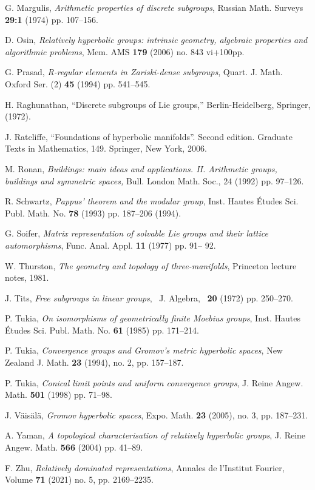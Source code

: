 \documentclass[12pt]{article}
\theoremstyle{boldplain}
\theoremstyle{bolddefinition}
\numberwithin{equation}{section}
\begin{document}
\begin{thebibliography}{BLP05}
G. Margulis, {\em Arithmetic properties of discrete subgroups}, 
Russian Math. Surveys {\bf 29:1} (1974)  pp. 107--156. 	


D. Osin, {\em Relatively hyperbolic groups: intrinsic geometry, algebraic properties and algorithmic problems},
Mem. AMS {\bf 179} (2006) no. 843 vi+100pp. 

G. Prasad, 
{\em R-regular elements in Zariski-dense subgroups}, 
Quart. J. Math. Oxford Ser. (2) {\bf 45} (1994) pp. 541--545. 


H. Raghunathan,  ``Discrete subgroups of Lie groups,'' 
Berlin-Heidelberg, Springer,  (1972).

J. Ratcliffe, ``Foundations of hyperbolic manifolds''. Second edition. Graduate Texts in Mathematics, 149. Springer, New York, 2006.

M. Ronan, {\em Buildings: main ideas and applications. II. Arithmetic groups, buildings and symmetric spaces,} Bull. London Math. Soc., 24 (1992) pp. 97--126. 

R. Schwartz, {\em Pappus' theorem and the modular group}, Inst. Hautes \'Etudes Sci. Publ. Math. No. {\bf 78} (1993) pp. 187--206 (1994). 
 
 G. Soifer, 
{\em Matrix representation of solvable Lie groups and their lattice automorphisms}, Func. Anal. Appl. {\bf 11} (1977) pp. 91-- 92.
 

W. Thurston, {\em The geometry and topology of three-manifolds}, Princeton lecture notes, 1981. 

J. Tits, {\em Free subgroups in linear groups}, 
J. Algebra,  {\bf 20} (1972) pp. 250--270.

P. Tukia, {\em On isomorphisms of geometrically finite Moebius groups}, Inst. Hautes \'Etudes 
Sci. Publ. Math. No. {\bf 61} (1985) pp. 171--214.

P. Tukia, {\em Convergence groups and Gromov's metric hyperbolic spaces}, 
New Zealand J. Math. {\bf 23} (1994), no. 2, pp. 157--187.

P. Tukia, 
{\em Conical limit points and uniform convergence groups}, 
J. Reine Angew. Math. {\bf 501} (1998) pp. 71--98.

J. V\"{a}is\"{a}l\"{a}, {\em Gromov hyperbolic spaces},  
Expo. Math. {\bf 23} (2005), no. 3, pp. 187--231. 

A. Yaman, {\em A topological characterisation of relatively hyperbolic groups}, 
J. Reine Angew. Math. {\bf 566} (2004) pp. 41--89. 

F. Zhu, {\em Relatively dominated representations}, Annales de l'Institut Fourier, Volume {\bf 71} (2021) no. 5, pp. 2169--2235.


\end{thebibliography}
\end{document}
